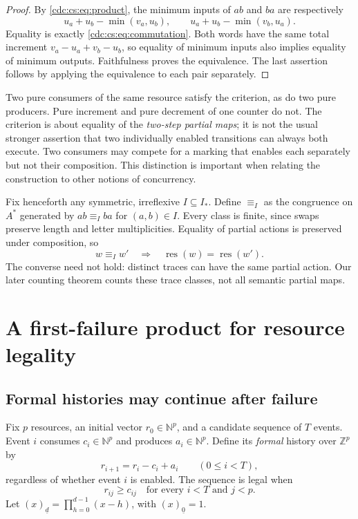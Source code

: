 \documentclass[11pt,a4paper]{article}
\theoremstyle{definition}
\theoremstyle{remark}
\newcommand{\N}{\mathbb N}
\newcommand{\Z}{\mathbb Z}
\newcommand{\Summ}{\operatorname{res}}
\newcommand{\ff}[2]{(#1)_{\underline{#2}}}
\newcommand{\srctag}[1]{\texorpdfstring{\hspace{0.5em}{\normalfont\small\color{accent}[#1]}}{ [#1]}}
\begin{document}
\begin{proof}
By \eqref{cdc:cs:eq:product}, the minimum inputs of $ab$ and $ba$ are respectively
\[
u_a+u_b-\min(v_a,u_b),\qquad
u_a+u_b-\min(v_b,u_a).
\]
Equality is exactly \eqref{cdc:cs:eq:commutation}. Both words have the same total
increment $v_a-u_a+v_b-u_b$, so equality of minimum inputs also implies
equality of minimum outputs. Faithfulness proves the equivalence. The last
assertion follows by applying the equivalence to each pair separately.
\end{proof}

Two pure consumers of the same resource satisfy the criterion, as do two
pure producers. Pure increment and pure decrement of one counter do not.
The criterion is about equality of the \emph{two-step partial maps}; it is
not the usual stronger assertion that two individually enabled transitions
can always both execute. Two consumers may compete for a marking that enables
each separately but not their composition. This distinction is important
when relating the construction to other notions of concurrency.

Fix henceforth any symmetric, irreflexive $I\subseteq I_*$. Define
$\equiv_I$ as the congruence on $A^*$ generated by $ab\equiv_I ba$ for
$(a,b)\in I$. Every class is finite, since swaps preserve length and letter
multiplicities. Equality of partial actions is preserved under composition,
so
\begin{equation}
\label{cdc:cs:eq:traceinvariance}
w\equiv_I w'\quad\Longrightarrow\quad
\Summ(w)=\Summ(w').
\end{equation}
The converse need not hold: distinct traces can have the same partial action.
Our later counting theorem counts these trace classes, not all semantic
partial maps.


\section{A first-failure product for resource legality\srctag{07}}
\subsection{Formal histories may continue after failure}
Fix $p$ resources, an initial vector $r_0\in\N^p$, and a candidate sequence of $T$ events. Event $i$ consumes $c_i\in\N^p$ and produces $a_i\in\N^p$. Define its \emph{formal} history over $\Z^p$ by
\[
 r_{i+1}=r_i-c_i+a_i\qquad(0\leq i<T),
\]
regardless of whether event $i$ is enabled. The sequence is legal when
\[
 r_{ij}\geq c_{ij}\quad\text{for every }i<T\text{ and }j<p.
\]
Let $\ff{x}{d}=\prod_{h=0}^{d-1}(x-h)$, with $\ff{x}{0}=1$.
\end{document}
